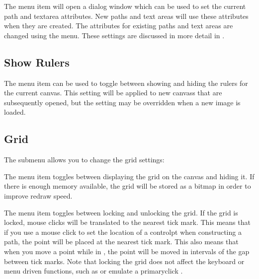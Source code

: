 
The  menu item will open a dialog window
which can be used to set the current \gls{path} and
\gls{textarea} attributes. New paths and text areas will use these
attributes when they are created. The attributes for existing paths
and text areas are changed using the  menu.  These
settings are discussed in more detail in .

\subsection{Show Rulers}\label{sec:showrulers}


The  menu item can be used to toggle between showing
and hiding the \glspl{ruler} for the current \gls{canvas}. This
setting will be applied to new \glspl{canvas} that are subsequently
opened, but the setting may be overridden when a new image is
loaded.


\subsection{Grid}\label{sec:gridmenu}


The  submenu allows you to change
the \gls{grid} settings:


The  menu item toggles between displaying
the \gls{grid} on the \gls{canvas} and hiding it. If there is
enough memory available, the grid will be stored as a bitmap in
order to improve redraw speed.


The  menu item toggles between locking and
unlocking the grid. If the grid is locked, mouse \glspl{click} will
be translated to the nearest tick mark.  This means that if you use
a mouse \gls{click} to set the location of a \gls{controlpt} when
constructing a \gls{path}, the point will be placed at the nearest
tick mark. This also means that when you move a point while in 
\editpathmode, the point will be moved in
intervals of the gap between tick marks. Note that locking the grid
does not affect the keyboard or menu driven functions, such as
 
or emulate a \gls{primaryclick}
.


